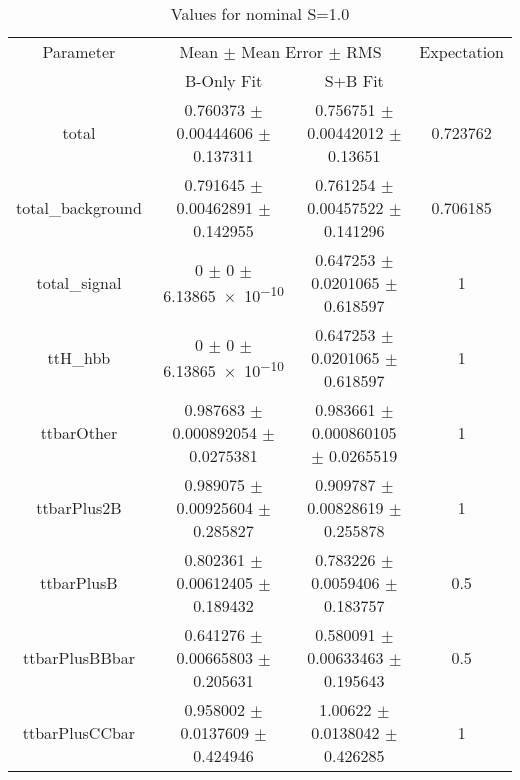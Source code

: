 \begin{table}
\centering
\caption{Values for nominal S=1.0}
\begin{tabular}{cccc}
\toprule
Parameter & \multicolumn{2}{c}{Mean $\pm$ Mean Error $\pm$ RMS} & Expectation\\
 & B-Only Fit & S+B Fit & \\
\midrule
total & \num{0.760373} $\pm$ \num{0.00444606} $\pm$ \num{0.137311} & \num{0.756751} $\pm$ \num{0.00442012} $\pm$ \num{0.13651} & \num{0.723762}\\
total\_background & \num{0.791645} $\pm$ \num{0.00462891} $\pm$ \num{0.142955} & \num{0.761254} $\pm$ \num{0.00457522} $\pm$ \num{0.141296} & \num{0.706185}\\
total\_signal & \num{0} $\pm$ \num{0} $\pm$ \num{6.13865e-10} & \num{0.647253} $\pm$ \num{0.0201065} $\pm$ \num{0.618597} & \num{1}\\
ttH\_hbb & \num{0} $\pm$ \num{0} $\pm$ \num{6.13865e-10} & \num{0.647253} $\pm$ \num{0.0201065} $\pm$ \num{0.618597} & \num{1}\\
ttbarOther & \num{0.987683} $\pm$ \num{0.000892054} $\pm$ \num{0.0275381} & \num{0.983661} $\pm$ \num{0.000860105} $\pm$ \num{0.0265519} & \num{1}\\
ttbarPlus2B & \num{0.989075} $\pm$ \num{0.00925604} $\pm$ \num{0.285827} & \num{0.909787} $\pm$ \num{0.00828619} $\pm$ \num{0.255878} & \num{1}\\
ttbarPlusB & \num{0.802361} $\pm$ \num{0.00612405} $\pm$ \num{0.189432} & \num{0.783226} $\pm$ \num{0.0059406} $\pm$ \num{0.183757} & \num{0.5}\\
ttbarPlusBBbar & \num{0.641276} $\pm$ \num{0.00665803} $\pm$ \num{0.205631} & \num{0.580091} $\pm$ \num{0.00633463} $\pm$ \num{0.195643} & \num{0.5}\\
ttbarPlusCCbar & \num{0.958002} $\pm$ \num{0.0137609} $\pm$ \num{0.424946} & \num{1.00622} $\pm$ \num{0.0138042} $\pm$ \num{0.426285} & \num{1}\\
\bottomrule
\end{tabular}
\end{table}